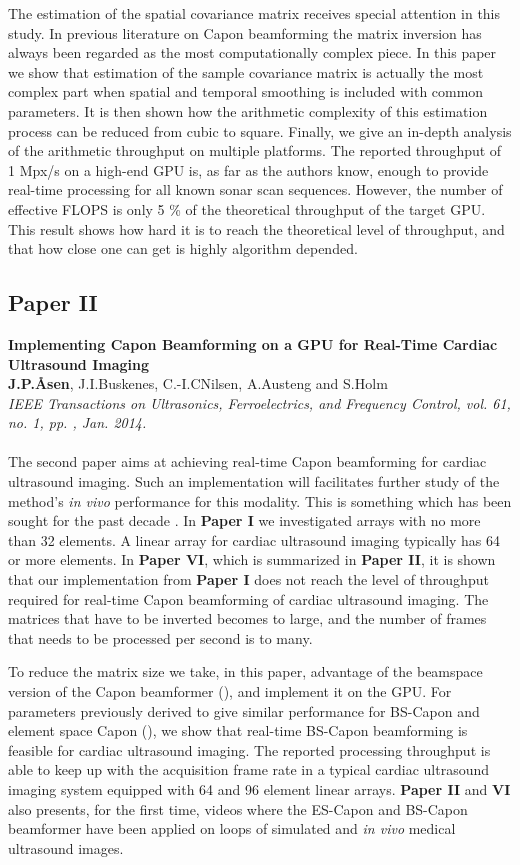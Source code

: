 The estimation of the spatial covariance matrix receives special attention in this study. In previous literature on Capon beamforming the matrix inversion has always been regarded as the most computationally complex piece. In this paper we show that estimation of the sample covariance matrix is actually the most complex part when spatial and temporal smoothing is included with common parameters. It is then shown how the arithmetic complexity of this estimation process can be reduced from cubic to square. Finally, we give an in-depth analysis of the arithmetic throughput on multiple platforms. The reported throughput of 1 Mpx/s on a high-end GPU is, as far as the authors know, enough to provide real-time processing for all known sonar scan sequences. However, the number of effective FLOPS is only 5 \% of the theoretical throughput of the target GPU. This result shows how hard it is to reach the theoretical level of throughput, and that how close one can get is highly algorithm depended. 

\subsection{Paper II}
\textbf{Implementing Capon Beamforming on a GPU for Real-Time Cardiac Ultrasound Imaging}\\
\textbf{J.\:P.\:\AA{}sen}, J.\:I.\:Buskenes, C.-I.\:C\:Nilsen, A.\:Austeng and S.\:Holm\\
{\it IEEE Transactions on Ultrasonics, Ferroelectrics, and Frequency Control, vol. 61, no. 1, pp. , Jan. 2014.}\\\\
The second paper aims at achieving real-time Capon beamforming for cardiac ultrasound imaging. Such an implementation will facilitates further study of the method's \textit{in vivo} performance for this modality. This is something which has been sought for the past decade . In \textbf{Paper I} we investigated arrays with no more than 32 elements. A linear array for cardiac ultrasound imaging typically has 64 or more elements. In \textbf{Paper VI}, which is summarized in \textbf{Paper II}, it is shown that our implementation from  \textbf{Paper I} does not reach the level of throughput required for real-time Capon beamforming of cardiac ultrasound imaging. The matrices that have to be inverted becomes to large, and the number of frames that needs to be processed per second is to many.

To reduce the matrix size we take, in this paper, advantage of the beamspace version of the Capon beamformer (), and implement it on the GPU. For parameters previously derived to give similar performance for BS-Capon and element space Capon (), we show that real-time BS-Capon beamforming is feasible for cardiac ultrasound imaging. The reported processing throughput is able to keep up with the acquisition frame rate in a typical cardiac ultrasound imaging system equipped with 64 and 96 element linear arrays.  \textbf{Paper II} and \textbf{VI} also presents, for the first time, videos where the ES-Capon and BS-Capon beamformer have been applied on loops of simulated and \textit{in vivo} medical ultrasound images.

